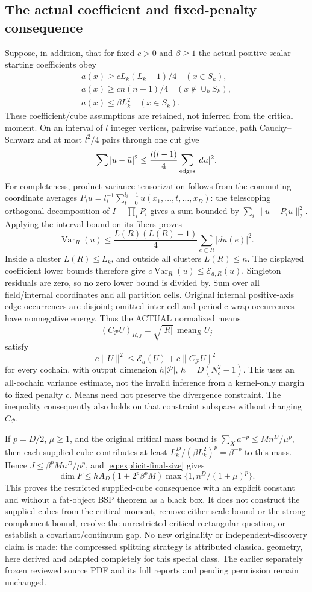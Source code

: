 \subsection{The actual coefficient and fixed-penalty consequence}
Suppose, in addition, that for fixed $c>0$ and $\beta\geq1$ the actual
positive scalar starting coefficients obey
\[
 \begin{gathered}
 a(x)\geq cL_k(L_k-1)/4\quad(x\in S_k),\\
 a(x)\geq cn(n-1)/4\quad(x\notin\cup_k S_k),\\
 a(x)\leq\beta L_k^2\quad(x\in S_k).
 \end{gathered}
\]
These coefficient/cube assumptions are retained, not inferred from the
critical moment. On an interval of $l$ integer vertices, pairwise variance,
path Cauchy--Schwarz and at most $l^2/4$ pairs through one cut give
\[
 \sum|u-\bar u|^2\leq\frac{l(l-1)}4\sum_{\rm edges}|du|^2.
\]
For completeness, product variance tensorization follows from the commuting
coordinate averages $P_i u=l_i^{-1}\sum_{t=0}^{l_i-1}u(x_1,\ldots,t,\ldots,x_D)$: the telescoping orthogonal decomposition of
$I-\prod_iP_i$ gives a sum bounded by
$\sum_i\|u-P_i u\|_2^2$. Applying the interval bound on its fibers proves
\[
 \operatorname{Var}_R(u)\leq\frac{L(R)(L(R)-1)}4
                      \sum_{e\subset R}|du(e)|^2.
\]
Inside a cluster $L(R)\leq L_k$, and outside all clusters $L(R)\leq n$.
The displayed coefficient lower bounds therefore give
$c\operatorname{Var}_R(u)\leq\mathcal E_{a,R}(u)$.
Singleton residuals are zero, so no zero lower bound is divided by.
Sum over all field/internal coordinates and all partition cells. Original
internal positive-axis edge occurrences are disjoint; omitted inter-cell
and periodic-wrap occurrences have nonnegative energy. Thus the ACTUAL
normalized means
\[
 (C_{\mathcal P}U)_{R,j}=\sqrt{|R|}\,\operatorname{mean}_R U_j
\]
satisfy
\[
 c\|U\|^2\leq\mathcal E_a(U)+c\|C_{\mathcal P}U\|^2
\]
for every cochain, with output dimension $h|\mathcal P|$,
$h=D(N_c^2-1)$. This uses an all-cochain variance estimate, not the invalid
inference from a kernel-only margin to fixed penalty $c$. Means need not
preserve the divergence constraint. The inequality consequently also
holds on that constraint subspace without changing $C_{\mathcal P}$.

If $p=D/2$, $\mu\geq1$, and the original critical mass bound is
$\sum_Xa^{-p}\leq Mn^D/\mu^p$, then each supplied cube contributes
at least $L_k^D/(\beta L_k^2)^p=\beta^{-p}$ to this mass. Hence
$J\leq\beta^pMn^D/\mu^p$, and \eqref{eq:explicit-final-size} gives
\[
 \dim F\leq hA_D(1+2^p\beta^pM)
                   \max\{1,n^D/(1+\mu)^p\}.
\]
This proves the restricted supplied-cube consequence with an explicit
constant and without a fat-object BSP theorem as a black box. It does
not construct the supplied cubes from the critical moment, remove either
scale bound or the strong complement bound, resolve the unrestricted
critical rectangular question, or establish a covariant/continuum gap.
No new originality or independent-discovery claim is made: the compressed
splitting strategy is attributed classical geometry, here derived and
adapted completely for this special class. The earlier separately frozen reviewed source PDF and
its full reports and pending permission remain unchanged.
